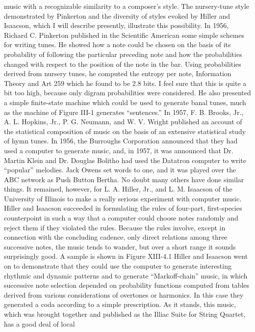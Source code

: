 {{{{{{{{{{{{music with a recognizable similarity to a composer’s style. The
nursery-tune style demonstrated by Pinkerton and the diversity of
styles evoked by Hiller and Isaacson, which I will describe presently,
illustrate this possibility.
In 1956, Richard C. Pinkerton published in the Scientific American
some simple schemes for writing tunes. He showed how a note
could be chosen on the basis of its probability of following the
particular preceding note and how the probabilities changed with
respect to the position of the note in the bar. Using probabilities
derived from nursery tunes, he computed the entropy per note,
Information Theory and Art
259
which he found to be 2.8 bits. I feel sure that this is quite a bit too
high, because only digram probabilities were considered. He also
presented a simple finite-state machine which could be used to
generate banal tunes, much as the machine of Figure III-1 generates
“sentences.”
In 1957, F. B. Brooks, Jr., A. L. Hopkins, Jr., P. G. Neumann,
and W. V. Wright published an account of the statistical composition
of music on the basis of an extensive statistical study of
hymn tunes.
In 1956, the Burroughs Corporation announced that they had
used a computer to generate music, and, in 1957, it was announced
that Dr. Martin Klein and Dr. Douglas Bolitho had used the
Datatron computer to write “popular” melodies. Jack Owens set
words to one, and it was played over the ABC network as Push
Button Bertha. No doubt many others have done similar things.
It remained, however, for L. A. Hiller, Jr., and L. M. Isaacson of
the University of Illinois to make a really serious experiment with
computer music. Hiller and Isaacson succeeded in formulating the
rules of four-part, first-species counterpoint in such a way that a
computer could choose notes randomly and reject them if they
violated the rules.
Because the rules involve, except in connection with the concluding
cadence, only direct relations among three successive notes,
the music tends to wander, but over a short range it sounds
surprisingly good. A sample is shown in Figure XIII-4.1
Hiller and Isaacson went on to demonstrate that they could use
the computer to generate interesting rhythmic and dynamic patterns
and to generate “Markoff-chain” music, in which successive
note selection depended on probability functions computed from
tables derived from various considerations of overtones or harmonics.
In this case they generated a coda according to a simple
prescription.
As it stands, this music, which was brought together and published
as the Illiac Suite for String Quartet, has a good deal of local
}}}}}}}}}}}}
